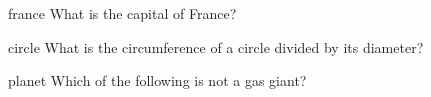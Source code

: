 \begin{defproblem}{france}
What is the capital of France?
\begin{oneparchoices}
\end{oneparchoices}
\end{defproblem}

\begin{defproblem}{circle}
What is the circumference of a circle divided by its diameter?
\begin{choices}
\end{choices}
\end{defproblem}

\begin{defproblem}{planet}
Which of the following is not a gas giant?
\begin{choices}
\end{choices}
\end{defproblem}
